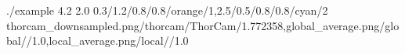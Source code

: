 \TrioComparisonFigure
        {./example}
        {4.2}
        {2.0}
        {0.3/1.2/0.8/0.8/orange/1,2.5/0.5/0.8/0.8/cyan/2}
        {thorcam_downsampled.png/thorcam/ThorCam/1.772358,global_average.png/global//1.0,local_average.png/local//1.0}
